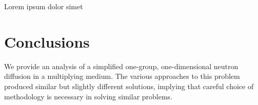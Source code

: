 \documentclass[../main.tex]{subfiles}
\begin{document}
Lorem ipsum dolor simet

\section{Conclusions}
	We provide an analysis of a simplified one-group, one-dimensional neutron diffusion in a multiplying medium. The various approaches to this problem produced similar but slightly different solutions, implying that careful choice of methodology is necessary in solving similar problems. 
\end{document}
